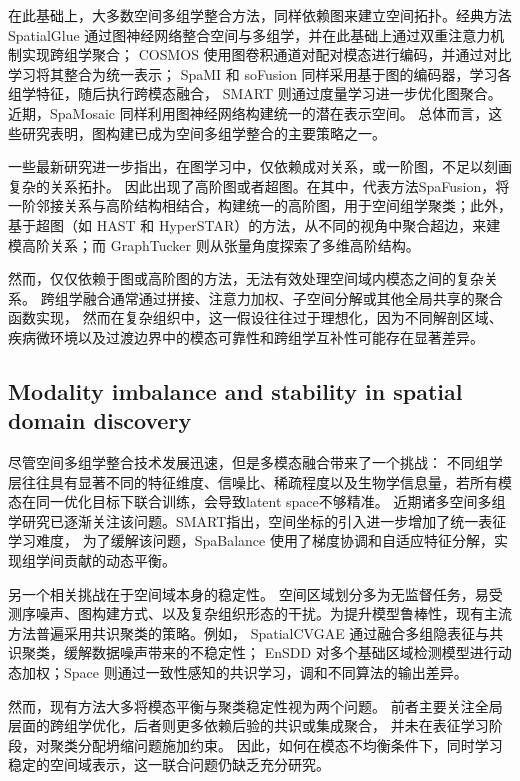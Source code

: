 \documentclass[journal]{IEEEtran}
\begin{document}
在此基础上，大多数空间多组学整合方法，同样依赖图来建立空间拓扑。经典方法SpatialGlue 
通过图神经网络整合空间与多组学，并在此基础上通过双重注意力机制实现跨组学聚合；
COSMOS 使用图卷积通道对配对模态进行编码，并通过对比学习将其整合为统一表示；
SpaMI 和 soFusion 同样采用基于图的编码器，学习各组学特征，随后执行跨模态融合，
SMART 则通过度量学习进一步优化图聚合。
近期，SpaMosaic 同样利用图神经网络构建统一的潜在表示空间。
总体而言，这些研究表明，图构建已成为空间多组学整合的主要策略之一。

一些最新研究进一步指出\cite{}，在图学习中，仅依赖成对关系，或一阶图，不足以刻画复杂的关系拓扑\cite{}。
因此出现了高阶图或者超图。在其中，代表方法SpaFusion，将一阶邻接关系与高阶结构相结合，构建统一的高阶图，用于空间组学聚类；此外，
基于超图（如 HAST 和 HyperSTAR）的方法，从不同的视角中聚合超边，来建模高阶关系；而 GraphTucker 则从张量角度探索了多维高阶结构。

然而，仅仅依赖于图或高阶图的方法，无法有效处理空间域内模态之间的复杂关系。
跨组学融合通常通过拼接、注意力加权、子空间分解或其他全局共享的聚合函数实现，
然而在复杂组织中，这一假设往往过于理想化，因为不同解剖区域、疾病微环境以及过渡边界中的模态可靠性和跨组学互补性可能存在显著差异。

\subsection{Modality imbalance and stability in spatial domain discovery}

尽管空间多组学整合技术发展迅速，但是多模态融合带来了一个挑战：
不同组学层往往具有显著不同的特征维度、信噪比、稀疏程度以及生物学信息量，若所有模态在同一优化目标下联合训练，会导致latent space不够精准。
近期诸多空间多组学研究已逐渐关注该问题。SMART指出，空间坐标的引入进一步增加了统一表征学习难度，
为了缓解该问题，SpaBalance 使用了梯度协调和自适应特征分解，实现组学间贡献的动态平衡。

另一个相关挑战在于空间域本身的稳定性。
空间区域划分多为无监督任务，易受测序噪声、图构建方式、以及复杂组织形态的干扰。为提升模型鲁棒性，现有主流方法普遍采用共识聚类的策略。例如，
SpatialCVGAE 通过融合多组隐表征与共识聚类，缓解数据噪声带来的不稳定性；
EnSDD 对多个基础区域检测模型进行动态加权；Space 则通过一致性感知的共识学习，调和不同算法的输出差异。

然而，现有方法大多将模态平衡与聚类稳定性视为两个问题。
前者主要关注全局层面的跨组学优化，后者则更多依赖后验的共识或集成聚合，
并未在表征学习阶段，对聚类分配坍缩问题施加约束。
因此，如何在模态不均衡条件下，同时学习稳定的空间域表示，这一联合问题仍缺乏充分研究。
\end{document}
